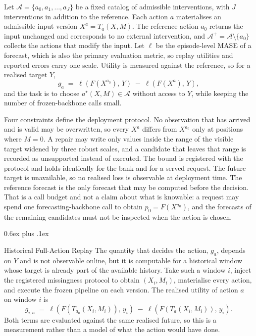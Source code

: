 \documentclass{article}
\makeatletter
\newcommand{\calA}{\mathcal{A}}
\newcommand{\loss}{\ell}
\def\subsection{\@startsection{subsection}{2}{\z@}{-1.4ex plus -0.4ex minus -.2ex}%
  {0.6ex plus .1ex}{\normalsize\sc\raggedright}}
\makeatother
\begin{document}
Let $\calA = \{a_0, a_1, \dots, a_J\}$ be a fixed catalog of admissible interventions, with
$J$ interventions in addition to the reference. Each action $a$ materialises an admissible
input version $X^{a} = T_a(X, M)$. The reference action $a_0$ returns the input unchanged and
corresponds to no external intervention, and $\calA^{+} = \calA \setminus \{a_0\}$ collects
the actions that modify the input. Let $\loss$ be the episode-level MASE of a forecast, which is also the primary evaluation
metric, so replay utilities and reported errors carry one scale. Utility is measured against the reference, so for a realised target
$Y$,
\begin{equation}
  g_a \;=\; \loss\!\left(F(X^{a_0}),\, Y\right) \;-\; \loss\!\left(F(X^{a}),\, Y\right),
  \label{eq:utility}
\end{equation}
and the task is to choose $a^\star(X, M) \in \calA$ without access to $Y$, while keeping the
number of frozen-backbone calls small.

Four constraints define the deployment protocol. No observation that has arrived and is valid
may be overwritten, so every $X^{a}$ differs from $X^{a_0}$ only at positions where $M = 0$.
A repair may write only values inside the range of the visible target widened by three robust
scales, and a candidate that leaves that range is recorded as unsupported instead of executed.
The bound is registered with the protocol and holds identically for the bank and for a served
request. The future target is unavailable, so no realised loss is
observable at deployment time. The reference forecast is the only forecast that may be computed
before the decision. That is a call budget and not a claim about what is knowable: a
request may spend one forecasting-backbone call to obtain $p_0 = F(X^{a_0})$, and the forecasts
of the remaining candidates must not be inspected when the action is chosen.

\subsection{Historical Full-Action Replay}
\label{sec:method-replay}
The quantity that decides the action, $g_a$, depends on $Y$ and is not observable online, but it
is computable for a historical window whose target is already part of the available history.
Take such a window $i$, inject the registered missingness protocol to obtain $(X_i, M_i)$,
materialise every action, and execute the frozen pipeline on each version. The realised utility
of action $a$ on window $i$ is
\begin{equation}
  g_{i,a} \;=\; \loss\!\left(F(T_{a_0}(X_i, M_i)),\, y_i\right)
  \;-\; \loss\!\left(F(T_{a}(X_i, M_i)),\, y_i\right).
  \label{eq:replay-gain}
\end{equation}
Both terms are evaluated against the same realised future, so this is a measurement rather
than a model of what the action would have done.
\end{document}
